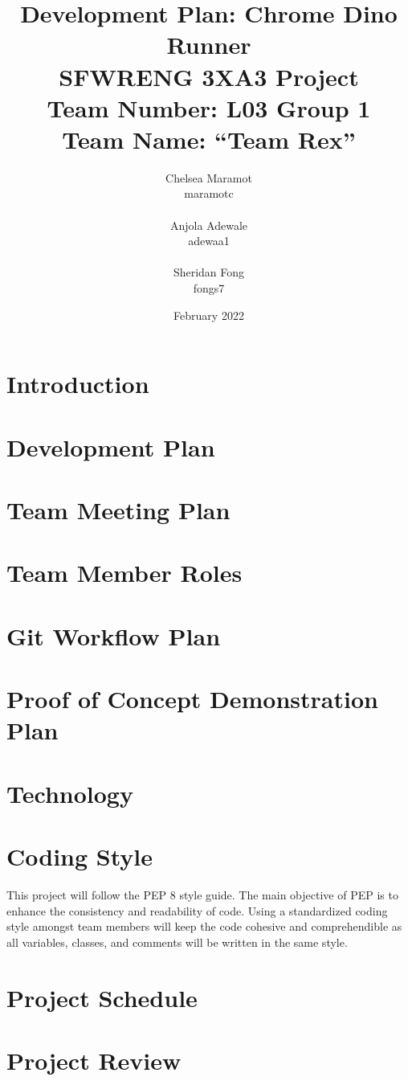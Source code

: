 \documentclass{article}
\title{Development Plan: Chrome Dino Runner \\ \bigskip \large SFWRENG 3XA3 Project \\ \bigskip \large Team Number: L03 Group 1 \\ \large Team Name: ``Team Rex'' }
\author{Chelsea Maramot \\ maramotc \\ \\ Anjola Adewale \\ adewaa1 \\ \\ Sheridan Fong \\ fongs7 }
\date{February 2022}
\begin{document}
	
	\maketitle
	
	\section{Introduction}
	
	\section{Development Plan}
	
	\section{Team Meeting Plan}
	
	\section{Team Member Roles}
	
	\section{Git Workflow Plan}
	
	\section{Proof of Concept Demonstration Plan}
	
	\section{Technology}
	
	\section{Coding Style}
	This project will follow the PEP 8 style guide. The main objective of PEP is to enhance the consistency and readability of code. Using a standardized coding style amongst team members will keep the code cohesive and comprehendible as all variables, classes, and comments will be written in the same style. 
	
	\section{Project Schedule}
	
	\section{Project Review}
	
\end{document}

